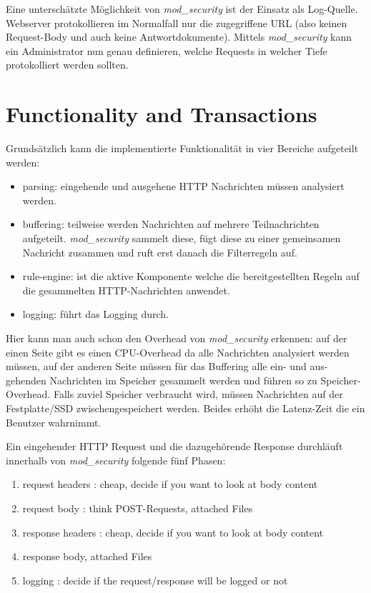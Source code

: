Eine unterschätzte Möglichkeit von \textit{mod\_security} ist der Einsatz als Log-Quelle. Webserver protokollieren im Normalfall nur die zugegriffene URL (also keinen Request-Body und auch keine Antwortdokumente). Mittels \textit{mod\_security} kann ein Administrator nun genau definieren, welche Requests in welcher Tiefe protokolliert werden sollten.

\section{Functionality and Transactions}

Grundsätzlich kann die implementierte Funktionalität in vier Bereiche aufgeteilt werden:

\begin{itemize}
	\item parsing: eingehende und ausgehene HTTP Nachrichten müssen analysiert werden.
	\item buffering: teilweise werden Nachrichten auf mehrere Teilnachrichten aufgeteilt. \textit{mod\_security} sammelt diese, fügt diese zu einer gemeinsamen Nachricht zusammen und ruft erst danach die Filterregeln auf.
	\item rule-engine: ist die aktive Komponente welche die bereitgestellten Regeln auf die gesammelten HTTP-Nachrichten anwendet.
	\item logging: führt das Logging durch.
\end{itemize}

Hier kann man auch schon den Overhead von \textit{mod\_security} erkennen: auf der einen Seite gibt es einen CPU-Overhead da alle Nachrichten analysiert werden müssen, auf der anderen Seite müssen für das Buffering alle ein- und aus-gehenden Nachrichten im Speicher gesammelt werden und führen so zu Speicher-Overhead. Falls zuviel Speicher verbraucht wird, müssen Nachrichten auf der Festplatte/SSD zwischengespeichert werden. Beides erhöht die Latenz-Zeit die ein Benutzer wahrnimmt.

Ein eingehender HTTP Request und die dazugehörende Response durchläuft innerhalb von \textit{mod\_security} folgende fünf Phasen:

\begin{enumerate}
	\item request headers : cheap, decide if you want to look at body content
	\item request body : think POST-Requests, attached Files
	\item response headers : cheap, decide if you want to look at body content
	\item response body, attached Files
	\item logging : decide if the request/response will be logged or not
\end{enumerate}

